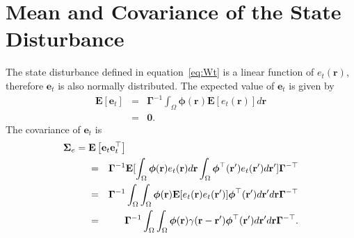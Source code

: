 \documentclass[]{article}
\begin{document}
\section*{Mean and Covariance of the State Disturbance }\label{ColoredNoise} 
The state disturbance defined in equation~\ref{eq:Wt} is a linear function of $e_t(\mathbf r)$, therefore $\mathbf{e}_t$ is also normally distributed. The expected value of $\mathbf e_t$ is given by 
\begin{eqnarray}
	\mathbf E\left[ \mathbf e_t\right]&=& \mathbf{\Gamma}^{-1}\int_{\Omega}\boldsymbol\phi\left(\mathbf{r}\right)\mathbf E\left[e_t\left(\mathbf{r}\right)\right] d\mathbf{r} \nonumber \\
	&=&\mathbf 0.
\end{eqnarray}
The covariance of $\mathbf{e}_t$ is 
\begin{eqnarray}
	\boldsymbol\Sigma_e =\lefteqn{\mathbf E\left[ \mathbf e_t\mathbf e_t^\top\right]} \nonumber \\ 
&=&\mathbf{\Gamma}^{-1}\mathbf E[\int_{\Omega}\boldsymbol{\phi}(\mathbf{r})e_t(\mathbf{r})d\mathbf{r} \int_{\Omega}\boldsymbol{\phi}^{\top}(\mathbf{r}') e_t(\mathbf{r}')d\mathbf{r}']\mathbf{\Gamma}^{- \top} \nonumber \\
	&=&\mathbf{\Gamma}^{-1}\int_{\Omega}\int_{\Omega} \boldsymbol{\phi}(\mathbf{r}) \mathbf E[e_t(\mathbf{r})e_t(\mathbf{r}')]\boldsymbol{\phi}^{\top}(\mathbf{r}')d\mathbf{r}' d\mathbf r\mathbf{\Gamma}^{- \top} \nonumber\\
	&=&\mathbf{\Gamma}^{-1}\int_{\Omega}\int_{\Omega}\boldsymbol{\phi}(\mathbf r) \gamma(\mathbf r- \mathbf r' )\boldsymbol{\phi}^{\top}(\mathbf r')d\mathbf r' d\mathbf r\mathbf{\Gamma}^{-\top}.
\end{eqnarray}
\end{document}
